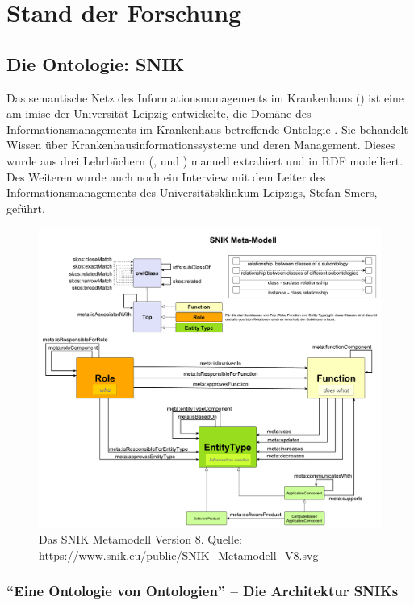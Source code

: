 \chapter{Stand der Forschung}\label{ch:relatedWork}

\section{Die Ontologie: SNIK}\label{sec:snik}

Das semantische Netz des Informationsmanagements im Krankenhaus (\label{acro:snik}) ist eine am \ac{imise} der Universität Leipzig entwickelte,
die Domäne des Informationsmanagements im Krankenhaus betreffende Ontologie \citep{domaene}.
Sie behandelt Wissen über Krankenhausinformationssysteme und deren Management.
Dieses wurde aus drei Lehrbüchern (\citet{bb}, \citet{ob} und \citet{he}) manuell extrahiert und in RDF modelliert.
Des Weiteren wurde auch noch ein Interview mit dem Leiter des Informationsmanagements des Universitätsklinkum Leipzigs, Stefan Smers, geführt.

\begin{figure}
\centering
\includegraphics[width=.8\textwidth, height=.9\textheight, keepaspectratio]{Images/snik-metamodel.pdf}
\caption[SNIK Metamodell Version 8]{Das SNIK Metamodell Version 8. Quelle: \url{https://www.snik.eu/public/SNIK_Metamodell_V8.svg}}
\label{fig:snik-metamodel}
\end{figure}

\subsection[Die Architektur SNIKs]{\enquote{Eine Ontologie von Ontologien} -- Die Architektur SNIKs}

